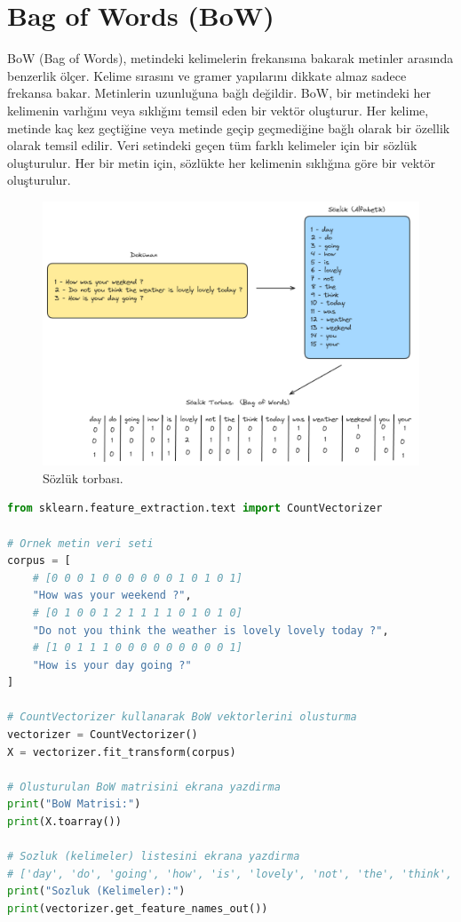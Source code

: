 \section{Bag of Words (BoW)}
BoW (Bag of Words), metindeki kelimelerin frekansına bakarak metinler arasında benzerlik ölçer. Kelime sırasını ve gramer yapılarını dikkate almaz sadece frekansa bakar. Metinlerin uzunluğuna bağlı değildir. BoW, bir metindeki her kelimenin varlığını veya sıklığını temsil eden bir vektör oluşturur. Her kelime, metinde kaç kez geçtiğine veya metinde geçip geçmediğine bağlı olarak bir özellik olarak temsil edilir. Veri setindeki geçen tüm farklı kelimeler için bir sözlük oluşturulur. Her bir metin için, sözlükte her kelimenin sıklığına göre bir vektör oluşturulur.  

\begin{figure}[h]
    \centering
    \includegraphics[width=1\textwidth]{images/bag_of_words.png}
    \caption{Sözlük torbası.}
    \label{fig:enter-label}
\end{figure}

\begin{lstlisting}[language=Python]
from sklearn.feature_extraction.text import CountVectorizer

# Ornek metin veri seti
corpus = [
    # [0 0 0 1 0 0 0 0 0 0 1 0 1 0 1]
    "How was your weekend ?",
    # [0 1 0 0 1 2 1 1 1 1 0 1 0 1 0]
    "Do not you think the weather is lovely lovely today ?",
    # [1 0 1 1 1 0 0 0 0 0 0 0 0 0 1]
    "How is your day going ?"
]

# CountVectorizer kullanarak BoW vektorlerini olusturma
vectorizer = CountVectorizer()
X = vectorizer.fit_transform(corpus)

# Olusturulan BoW matrisini ekrana yazdirma
print("BoW Matrisi:")
print(X.toarray())

# Sozluk (kelimeler) listesini ekrana yazdirma
# ['day', 'do', 'going', 'how', 'is', 'lovely', 'not', 'the', 'think', 'today', 'was', 'weather', 'weekend', 'you', 'your']
print("Sozluk (Kelimeler):")
print(vectorizer.get_feature_names_out())
\end{lstlisting}

\newpage